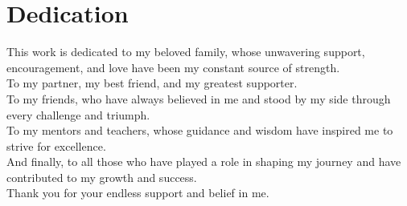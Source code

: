 \chapter*{Dedication}

\fontsize{14}{16}\selectfont
\setlength{\parindent}{0pt}


This work is dedicated to my beloved family, whose unwavering support,
encouragement, and love have been my constant source of strength.\\

To my partner, my best friend, and my greatest supporter.\\

To my friends, who have always believed in me and stood by my side through every challenge and triumph.\\

To my mentors and teachers, whose guidance and wisdom have inspired me to strive for excellence.\\

And finally, to all those who have played a role in shaping my journey and have contributed to my growth and success.\\

Thank you for your endless support and belief in me.